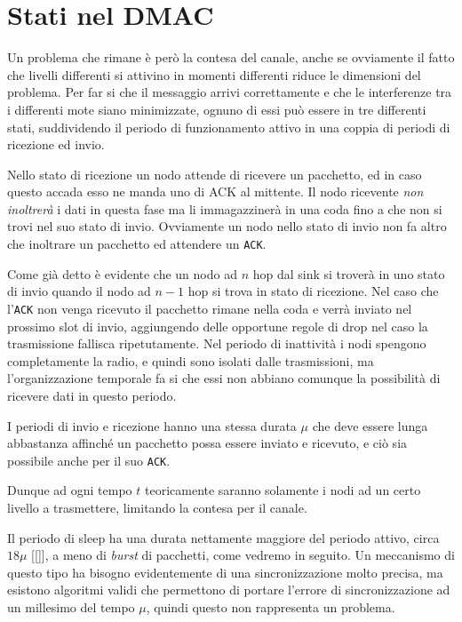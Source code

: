 \documentclass[pdftex,12pt,a4paper,italian,openany]{book}
\begin{document}
\section{Stati nel DMAC}
Un problema che rimane è però la contesa del canale, anche se ovviamente il fatto che livelli 
differenti si attivino in momenti differenti riduce le dimensioni del problema.
Per far si che il messaggio arrivi correttamente e che le interferenze tra i differenti 
mote siano minimizzate, ognuno di essi può essere in tre differenti stati, suddividendo il 
periodo di funzionamento attivo in una coppia di periodi di ricezione ed invio. 

Nello stato di ricezione un nodo attende di ricevere un pacchetto, ed in caso questo accada 
esso ne manda uno di ACK al mittente. Il nodo ricevente \emph{non inoltrerà} i dati in questa 
fase ma li immagazzinerà in una coda fino a che non si trovi nel suo stato di invio. 
Ovviamente un nodo nello stato di invio non fa altro che inoltrare un pacchetto ed attendere un 
\texttt{ACK}. 

Come già detto è evidente che un nodo ad $n$ hop dal sink si troverà in uno stato di invio 
quando il nodo ad $n-1$ hop si trova in stato di ricezione. 
Nel caso che l'\texttt{ACK}  non venga ricevuto il pacchetto rimane nella coda e 
verrà inviato nel prossimo slot di invio, aggiungendo delle opportune regole di drop nel caso 
la trasmissione fallisca ripetutamente. 
Nel periodo di inattività i nodi spengono completamente la radio, e quindi sono isolati dalle 
trasmissioni, ma l'organizzazione temporale fa si che essi non abbiano comunque la possibilità 
di ricevere dati in questo periodo. 

I periodi di invio e ricezione hanno una stessa durata $\mu$ che deve essere lunga abbastanza 
affinché un pacchetto possa essere inviato e ricevuto, e ciò sia possibile anche per il 
suo \texttt{ACK}. 
 
Dunque ad ogni tempo $t$ teoricamente saranno solamente i nodi ad un certo livello a 
trasmettere, limitando la contesa per il canale. 

Il periodo di sleep ha una durata nettamente maggiore del periodo attivo, circa $18\mu$ [[]], a meno di \emph{burst} di pacchetti, come vedremo in seguito.
Un meccanismo di questo tipo ha bisogno evidentemente di una sincronizzazione molto precisa, ma 
esistono algoritmi validi che permettono di portare l'errore di sincronizzazione ad un millesimo 
del tempo $\mu$, quindi questo non rappresenta un problema. 
\end{document}
